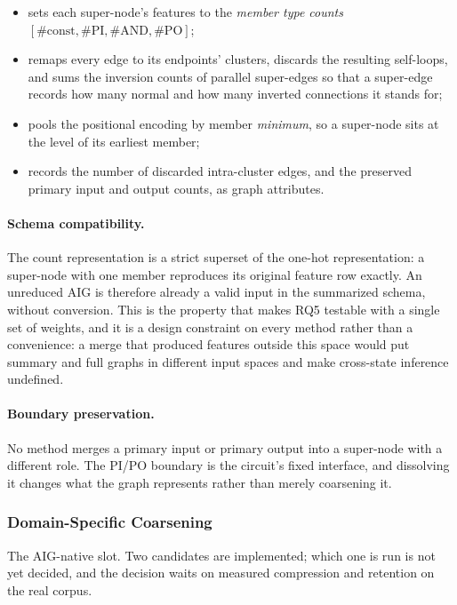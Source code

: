 \begin{itemize}
    \item sets each super-node's features to the \emph{member type counts}
    $[\#\mathrm{const}, \#\mathrm{PI}, \#\mathrm{AND}, \#\mathrm{PO}]$;
    \item remaps every edge to its endpoints' clusters, discards the resulting self-loops,
    and sums the inversion counts of parallel super-edges so that a super-edge records how
    many normal and how many inverted connections it stands for;
    \item pools the positional encoding by member \emph{minimum}, so a super-node sits at
    the level of its earliest member;
    \item records the number of discarded intra-cluster edges, and the preserved primary
    input and output counts, as graph attributes.
\end{itemize}

\paragraph{Schema compatibility.}
\label{sec:method:summary:schema}
The count representation is a strict superset of the one-hot representation: a super-node
with one member reproduces its original feature row exactly. An unreduced AIG is therefore
already a valid input in the summarized schema, without conversion. This is the property
that makes RQ5 testable with a single set of weights, and it is a design constraint on every
method rather than a convenience: a merge that produced features outside this space would
put summary and full graphs in different input spaces and make cross-state inference
undefined.

\paragraph{Boundary preservation.}
No method merges a primary input or primary output into a super-node with a different role.
The PI/PO boundary is the circuit's fixed interface, and dissolving it changes what the graph
represents rather than merely coarsening it.


\subsubsection{Domain-Specific Coarsening}
\label{sec:method:summary:domain}
The AIG-native slot. Two candidates are implemented; which one is run is not yet decided,
and the decision waits on measured compression and retention on the real corpus.


